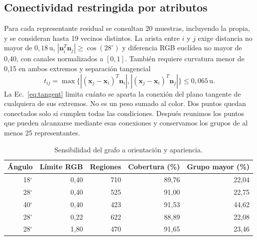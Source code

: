 \documentclass[journal,onecolumn]{IEEEtran}
\newcommand{\ucoord}{\,\mathrm{u}}
\begin{document}
\subsection{Conectividad restringida por atributos}
Para cada representante residual se consultan 20 muestras, incluyendo la propia, y se consideran hasta 19 vecinos distintos. La arista entre $i$ y $j$ exige distancia no mayor de $0,18\ucoord$, $|\mathbf{n}_i^T\mathbf{n}_j|\geq\cos(28^\circ)$ y diferencia RGB euclídea no mayor de 0,40, con canales normalizados a $[0,1]$. También requiere curvatura menor de 0,15 en ambos extremos y separación tangencial
\begin{equation}t_{ij}=\max\{|(\mathbf{x}_j-\mathbf{x}_i)^T\mathbf{n}_i|,|(\mathbf{x}_j-\mathbf{x}_i)^T\mathbf{n}_j|\}\leq0,065\ucoord.\label{eq:tangent}\end{equation}
La Ec.~\eqref{eq:tangent} limita cuánto se aparta la conexión del plano tangente de cualquiera de sus extremos. No es un peso sumado al color. Dos puntos quedan conectados solo si cumplen todas las condiciones. Después reunimos los puntos que pueden alcanzarse mediante esas conexiones y conservamos los grupos de al menos 25 representantes.
\begin{table}[H]
\centering\caption{Sensibilidad del grafo a orientación y apariencia.}\label{tab:atributos}
\small
\begin{tabular}{rrrrr}\toprule
Ángulo & Límite RGB & Regiones & Cobertura (\%) & Grupo mayor (\%)\\\midrule
18$^\circ$ & 0,40 & 710 & 89,76 & 22,04\\
28$^\circ$ & 0,40 & 525 & 91,00 & 22,75\\
40$^\circ$ & 0,40 & 423 & 91,53 & 44,62\\
28$^\circ$ & 0,22 & 622 & 88,89 & 22,08\\
28$^\circ$ & 1,80 & 470 & 91,65 & 23,46\\
\bottomrule\end{tabular}
\end{table}
\end{document}
